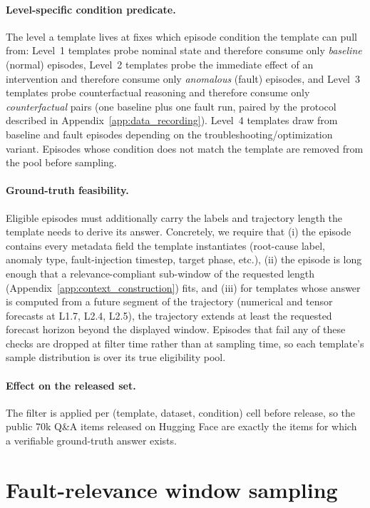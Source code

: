 \paragraph{Level-specific condition predicate.} The level a template lives at fixes which episode condition the template can pull from: Level~1 templates probe nominal state and therefore consume only \emph{baseline} (normal) episodes, Level~2 templates probe the immediate effect of an intervention and therefore consume only \emph{anomalous} (fault) episodes, and Level~3 templates probe counterfactual reasoning and therefore consume only \emph{counterfactual} pairs (one baseline plus one fault run, paired by the protocol described in Appendix~\ref{app:data_recording}). Level~4 templates draw from baseline and fault episodes depending on the troubleshooting/optimization variant. Episodes whose condition does not match the template are removed from the pool before sampling.

\paragraph{Ground-truth feasibility.} Eligible episodes must additionally carry the labels and trajectory length the template needs to derive its answer. Concretely, we require that (i) the episode contains every metadata field the template instantiates (root-cause label, anomaly type, fault-injection timestep, target phase, etc.), (ii) the episode is long enough that a relevance-compliant sub-window of the requested length (Appendix~\ref{app:context_construction}) fits, and (iii) for templates whose answer is computed from a future segment of the trajectory (numerical and tensor forecasts at L1.7, L2.4, L2.5), the trajectory extends at least the requested forecast horizon beyond the displayed window. Episodes that fail any of these checks are dropped at filter time rather than at sampling time, so each template's sample distribution is over its true eligibility pool.

\paragraph{Effect on the released set.} The filter is applied per (template, dataset, condition) cell before release, so the public 70k Q\&A items released on Hugging Face are exactly the items for which a verifiable ground-truth answer exists.

\section{Fault-relevance window sampling}
\label{app:relevance}

